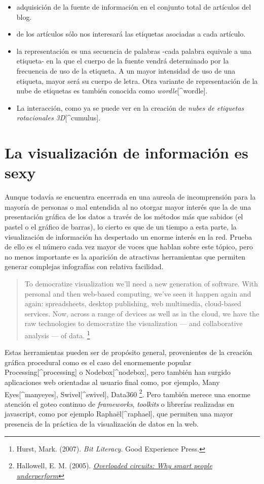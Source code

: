 \documentclass[12pt, a4paper,twoside]{book}
\begin{document}
\begin{itemize}
\item
  adquisición de la fuente de información en el conjunto total de
  artículos del blog.
\item
  de los artículos sólo nos interesará las etiquetas asociadas a cada
  artículo.
\item
  la representación es una secuencia de palabras -cada palabra
  equivale a una etiqueta- en la que el cuerpo de la fuente vendrá
  determinado por la frecuencia de uso de la etiqueta. A un mayor
  intensidad de uso de una etiqueta, mayor será su cuerpo de letra.
  Otra variante de representación de la nube de etiquetas es también
  conocida como \emph{wordle}[\^{}wordle].
\item
  La interacción, como ya se puede ver en la creación de
  \emph{nubes de etiquetas rotacionales 3D}[\^{}cumulus].
\end{itemize}
\section{La visualización de información es sexy}

Aunque todavía se encuentra encerrada en una aureola de
incomprensión para la mayoría de personas o mal entendida al no
otorgar mayor interés que la de una presentación gráfica de los
datos a través de los métodos más que sabidos (el pastel o el
gráfico de barras), lo cierto es que de un tiempo a esta parte, la
visualización de información ha despertado un enorme interés en la
red. Prueba de ello es el número cada vez mayor de voces que hablan
sobre este tópico, pero no menos importante es la aparición de
atractivas herramientas que permiten generar complejas infografías
con relativa facilidad.

\begin{quote}
To democratize visualization we'll need a new generation of
software. With personal and then web-based computing, we've seen it
happen again and again: spreadsheets, desktop publishing, web
multimedia, cloud-based services. Now, across a range of devices as
well as in the cloud, we have the raw technologies to democratize
the visualization --- and collaborative analysis --- of data.%
\footnote{Hurst, Mark. (2007). \emph{Bit Literacy}. Good Experience Press.}

\end{quote}
Estas herramientas pueden ser de propósito general, provenientes de
la creación gráfica procedural como es el caso del enormemente
popular Processing[\^{}processing] o Nodebox[\^{}nodebox], pero
también han surgido aplicaciones web orientadas al usuario final
como, por ejemplo, Many Eyes[\^{}manyeyes], Swivel[\^{}swivel],
Data360%
\footnote{Hallowell, E. M. (2005).
\emph{\href{http://tr.im/wSsS}{Overloaded circuits: Why smart people underperform}}}.
Pero también merece una enorme atención el goteo continuo de
\emph{frameworks}, \emph{toolkits} o librerías realizadas en
javascript, como por ejemplo Raphaël[\^{}raphael], que permiten una
mayor presencia de la práctica de la visualización de datos en la
web.
\end{document}
